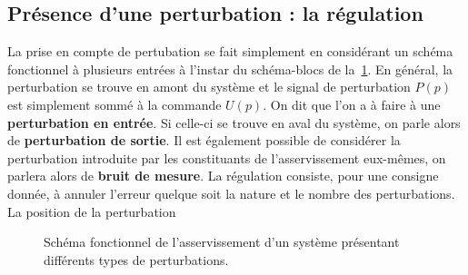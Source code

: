 \subsection{Présence d'une perturbation : la régulation}
La prise en compte de pertubation se fait simplement en considérant un schéma
fonctionnel à plusieurs entrées à l'instar du schéma-blocs de 
la~\cref{fig-pert2}. En général, la perturbation se trouve en amont
du système et le signal de perturbation $P(p)$ est simplement sommé à la 
commande $U(p)$. On dit que l'on a à faire à une \textbf{perturbation 
en entrée}. Si celle-ci se trouve en aval du système, on parle alors de 
\textbf{perturbation de sortie}. Il est également possible de considérer la 
perturbation introduite par les constituants de l'asservissement eux-mêmes, 
on parlera alors de \textbf{bruit de mesure}.
La régulation consiste, pour une consigne donnée, à annuler l'erreur 
quelque soit la nature et le nombre des perturbations.
%    
La position de la perturbation 

\begin{figure}[!h]
    \centering
    
    \caption{Schéma fonctionnel de l'asservissement d'un système 
             présentant différents types de perturbations. \label{fig-pert2}}
\end{figure}
